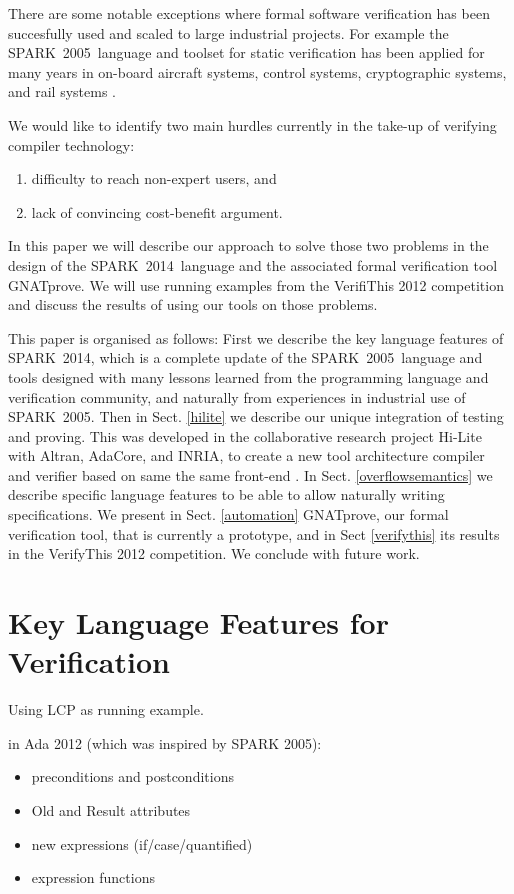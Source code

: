 \documentclass[sttt,draft]{svjour}
\newcommand{\hilite}{Hi-Lite}
\newcommand{\gnatprove}{GNATprove\xspace}
\newcommand{\oldspark}{SPARK~2005\xspace}
\newcommand{\newspark}{SPARK~2014\xspace}
\begin{document}
There are some notable exceptions where formal software verification
has been succesfully used and scaled to large industrial projects. For
example the \oldspark\ language and toolset for static verification
has been applied for many years in on-board aircraft systems, control
systems, cryptographic systems, and rail systems
\cite{sparkbook2012,oneill2012}.

We would like to identify two main hurdles currently in the take-up of
verifying compiler technology:
%
\begin{enumerate}
\item difficulty to reach non-expert users, and
\item lack of convincing cost-benefit argument.
\end{enumerate}
%
In this paper we will describe our approach to solve those two
problems in the design of the \newspark\ language and the associated
formal verification tool \gnatprove. We will use running examples from
the VerifiThis 2012 competition and discuss the results of using our
tools on those problems.

This paper is organised as follows: First we describe the key language
features of \newspark, which is a complete update of the
\oldspark\ language and tools designed with many lessons learned from
the programming language and verification community, and naturally
from experiences in industrial use of \oldspark. Then in
Sect. \ref{hilite} we describe our unique integration of testing and
proving. This was developed in the collaborative research project
\hilite\ \cite{hiliteERTS2012} with Altran, AdaCore, and INRIA, to
create a new tool architecture compiler and verifier based on same the
same front-end \cite{ksd2012}. In Sect. \ref{overflowsemantics} we
describe specific language features to be able to allow naturally
writing specifications. We present in Sect. \ref{automation}
GNATprove, our formal verification tool, that is currently a
prototype, and in Sect \ref{verifythis} its results in the VerifyThis
2012 competition. We conclude with future work.

\section{Key Language Features for Verification}
\label{langfeatures}
Using LCP as running example.

in Ada 2012 (which was inspired by SPARK 2005):
\begin{itemize}
\item preconditions and postconditions
\item Old and Result attributes
\item new expressions (if/case/quantified)
\item expression functions
\end{itemize}
\end{document}
